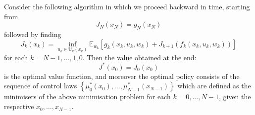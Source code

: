 \documentclass[11pt]{report} %
\begin{document}
Consider the following algorithm in which we proceed backward in time, starting from
\begin{equation}
J_{N}\left(x_{N}\right) = g_{N}\left(x_{N}\right)
\end{equation}
followed by finding
\begin{equation}
J_{k}\left(x_{k}\right) = \inf_{u_{k} \in \mathbb{U}_{k}\left(x_{k}\right)}\mathbb{E}_{w_{k}}\left[g_{k}\left(x_{k}, u_{k}, w_{k}\right) + J_{k + 1}\left(f_{k}\left(x_{k}, u_{k}, w_{k}\right)\right)\right]
\end{equation}
for each $k = N - 1, \dots, 1, 0$. Then the value obtained at the end:
\begin{equation}
J^{*}\left(x_{0}\right) = J_{0}\left(x_{0}\right)
\end{equation}
is the optimal value function, and moreover the optimal policy consists of the sequence of control laws $\left\{\mu_{0}^{*}\left(x_{0}\right), \dots, \mu_{N - 1}^{*}\left(x_{N - 1}\right)\right\}$ which are defined as the minimisers of the above minimisation problem for each $k = 0, \dots, N - 1$, given the respective $x_{0}, \dots, x_{N - 1}$.
\end{document}
